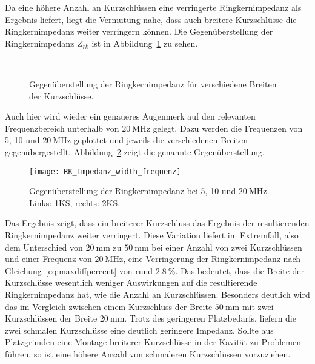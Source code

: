 Da eine h\"ohere Anzahl an Kurzschl\"ussen eine verringerte Ringkernimpedanz als Ergebnis liefert, liegt die Vermutung nahe, dass auch breitere Kurzschl\"usse die Ringkernimpedanz weiter verringern k\"onnen. Die Gegen\"uberstellung der Ringkernimpedanz $Z_{rk}$ ist in Abbildung~\ref{fig:ringcorewidth} zu sehen.
\begin{figure}[htb]
	\centering
	\\
	\caption{Gegen\"uberstellung der Ringkernimpedanz f\"ur verschiedene Breiten der Kurzschl\"usse.}
	\label{fig:ringcorewidth}
\end{figure}
\par
Auch hier wird wieder ein genaueres Augenmerk auf den relevanten Frequenzbereich unterhalb von $\SI{20}{\mega\hertz}$ gelegt. Dazu werden die Frequenzen von 5, 10 und $\SI{20}{\mega\hertz}$ geplottet und jeweils die verschiedenen Breiten gegen\"ubergestellt. Abbildung~\ref{fig:ringcorewidth20} zeigt die genannte Gegen\"uberstellung.



\newpage



\begin{figure}[h]
	\centering
	\texttt{[image: RK\_Impedanz\_width\_frequenz]}
	\caption{Gegen\"uberstellung der Ringkernimpedanz bei 5, 10 und $\SI{20}{\mega\hertz}$. Links: 1KS, rechts: 2KS.}
	\label{fig:ringcorewidth20}
\end{figure}
\par
Das Ergebnis zeigt, dass ein breiterer Kurzschluss das Ergebnis der resultierenden Ringkernimpedanz weiter verringert. Diese Variation liefert im Extremfall, also dem Unterschied von $\SI{20}{\milli\meter}$ zu $\SI{50}{\milli\meter}$ bei einer Anzahl von zwei Kurzschl\"ussen und einer Frequenz von $\SI{20}{\mega\hertz}$, eine Verringerung der Ringkernimpedanz nach Gleichung~\ref{eq:maxdiffpercent} von rund $\SI{2,8}{\%}$. Das bedeutet, dass die Breite der Kurzschl\"usse wesentlich weniger Auswirkungen auf die resultierende Ringkernimpedanz hat, wie die Anzahl an Kurzschl\"ussen. Besonders deutlich wird das im Vergleich zwischen einem Kurzschluss der Breite $\SI{50}{\milli\meter}$ mit zwei Kurzschl\"ussen der Breite $\SI{20}{\milli\meter}$. Trotz des geringeren Platzbedarfs, liefern die zwei schmalen Kurzschl\"usse eine deutlich geringere Impedanz.  Sollte aus Platzgr\"unden eine Montage breiterer Kurzschl\"usse in der Kavit\"at zu Problemen f\"uhren, so ist eine h\"ohere Anzahl von schmaleren Kurzschl\"ussen vorzuziehen. 


